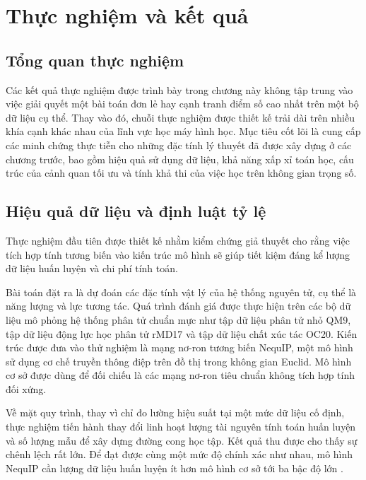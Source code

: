 
\section{Thực nghiệm và kết quả}
\label{sec:thuc-nghiem}

\subsection{Tổng quan thực nghiệm}
\label{subsec:tong-quan-thuc-nghiem}

Các kết quả thực nghiệm được trình bày trong chương này không tập trung vào việc giải quyết một bài toán đơn lẻ hay cạnh tranh điểm số cao nhất trên một bộ dữ liệu cụ thể. Thay vào đó, chuỗi thực nghiệm được thiết kế trải dài trên nhiều khía cạnh khác nhau của lĩnh vực học máy hình học. Mục tiêu cốt lõi là cung cấp các minh chứng thực tiễn cho những đặc tính lý thuyết đã được xây dựng ở các chương trước, bao gồm hiệu quả sử dụng dữ liệu, khả năng xấp xỉ toán học, cấu trúc của cảnh quan tối ưu và tính khả thi của việc học trên không gian trọng số.

\subsection{Hiệu quả dữ liệu và định luật tỷ lệ}
\label{subsec:hieu-qua-du-lieu}

Thực nghiệm đầu tiên được thiết kế nhằm kiểm chứng giả thuyết cho rằng việc tích hợp tính tương biến vào kiến trúc mô hình sẽ giúp tiết kiệm đáng kể lượng dữ liệu huấn luyện và chi phí tính toán.

Bài toán đặt ra là dự đoán các đặc tính vật lý của hệ thống nguyên tử, cụ thể là năng lượng và lực tương tác. Quá trình đánh giá được thực hiện trên các bộ dữ liệu mô phỏng hệ thống phân tử chuẩn mực như tập dữ liệu phân tử nhỏ QM9, tập dữ liệu động lực học phân tử rMD17 và tập dữ liệu chất xúc tác OC20. Kiến trúc được đưa vào thử nghiệm là mạng nơ-ron tương biến NequIP, một mô hình sử dụng cơ chế truyền thông điệp trên đồ thị trong không gian Euclid. Mô hình cơ sở được dùng để đối chiếu là các mạng nơ-ron tiêu chuẩn không tích hợp tính đối xứng.

Về mặt quy trình, thay vì chỉ đo lường hiệu suất tại một mức dữ liệu cố định, thực nghiệm tiến hành thay đổi linh hoạt lượng tài nguyên tính toán huấn luyện và số lượng mẫu để xây dựng đường cong học tập. Kết quả thu được cho thấy sự chênh lệch rất lớn. Để đạt được cùng một mức độ chính xác như nhau, mô hình NequIP cần lượng dữ liệu huấn luyện ít hơn mô hình cơ sở tới ba bậc độ lớn \cite{batzner2022nequip}. 

